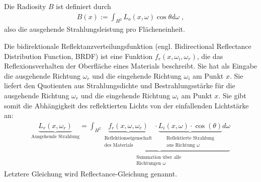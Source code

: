 \begin{Definition}
Die Radiosity $B$ ist definiert durch
\begin{align}
B(x) := \int_{H^2} L_o(x, \omega) \cos{\theta} d\omega \; ,
\end{align}
also die ausgehende Strahlungsleistung pro Flächeneinheit. 
\end{Definition}




\begin{Definition}
Die  bidirektionale Reflektanzverteilungsfunktion (engl. Bidirectional Reflectance Distribution Function, BRDF)
ist eine Funktion $f_r (x, \omega_i, \omega_r)$, die das Reflexionsverhalten der Oberfläche eines Materials beschreibt. 
Sie hat als Eingabe die ausgehende Richtung $\omega_r$ und die eingehende Richtung  $\omega_i$ am Punkt $x$. 
Sie  liefert den Quotienten aus Strahlungsdichte und Bestrahlungsstärke für die ausgehende Richtung $\omega_r$ und die eingehende Richtung  $\omega_i$ am Punkt $x$.
Sie gibt somit die Abhängigkeit des reflektierten Lichts von der einfallenden Lichtstärke an: 
\begin{align}
\underbrace{L_r(x, \omega_r)}_{\text{Ausgehende Strahlung}} =\underbrace{\int_{H^2} \underbrace{f_r (x, \omega, \omega_r)}_{\substack{\text{Reflektionseigenschaft} \\ \text{des Materials}}} \cdot  \underbrace{L_i(x, \omega) \cdot  \cos(\theta) }_{\substack{\text{Reflektierte Strahlung} \\ \text{aus Richtung $\omega$}}} d\omega}_{\substack{\text{Summation über alle } \\ \text{Richtungen $\omega$}}} 
\end{align}
Letztere Gleichung wird  Reflectance-Gleichung genannt.
\end{Definition}
